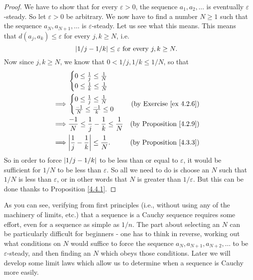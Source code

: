 \begin{proof}
We have to show that for every \(\varepsilon > 0\), the sequence \(a_1, a_2, \dots\) is eventually \(\varepsilon\)-steady.
So let \(\varepsilon > 0\) be arbitrary.
We now have to find a number \(N \geq 1\) such that the sequence \(a_N, a_{N + 1}, \dots\) is \(\varepsilon\)-steady.
Let us see what this means.
This means that \(d(a_j, a_k) \leq \varepsilon\) for every \(j, k \geq N\), i.e.
\[
    \abs*{1 / j - 1 / k} \leq \varepsilon \text{ for every } j, k \geq N.
\]
Now since \(j, k \geq N\), we know that \(0 < 1 / j, 1 / k \leq 1 / N\), so that
\begin{align*}
&
\begin{cases}
    0 \leq \frac{1}{j} \leq \frac{1}{N} \\
    0 \leq \frac{1}{k} \leq \frac{1}{N} \\
\end{cases}
\\
\implies &
\begin{cases}
    0 \leq \frac{1}{j} \leq \frac{1}{N} \\
    \frac{-1}{N} \leq \frac{-1}{k} \leq 0 \\
\end{cases}
& \text{(by Exercise \ref{ex 4.2.6})} \\
\implies & \frac{-1}{N} \leq \frac{1}{j} - \frac{1}{k} \leq \frac{1}{N} & \text{(by Proposition \ref{4.2.9})} \\
\implies & \abs*{\frac{1}{j} - \frac{1}{k}} \leq \frac{1}{N}. & \text{(by Proposition \ref{4.3.3})}
\end{align*}
So in order to force \(\abs*{1 / j - 1 / k}\) to be less than or equal to \(\varepsilon\), it would be sufficient for \(1 / N\) to be less than \(\varepsilon\).
So all we need to do is choose an \(N\) such that \(1 / N\) is less than \(\varepsilon\), or in other words that \(N\) is greater than \(1 / \varepsilon\).
But this can be done thanks to Proposition \ref{4.4.1}.
\end{proof}

\begin{note}
As you can see, verifying from first principles (i.e., without using any of the machinery of limits, etc.) that a sequence is a Cauchy sequence requires some effort, even for a sequence as simple as \(1 / n\).
The part about selecting an \(N\) can be particularly difficult for beginners
- one has to think in reverse, working out what conditions on \(N\) would suffice to force the sequence \(a_N, a_{N + 1}, a_{N + 2}, \dots\) to be \(\varepsilon\)-steady, and then finding an \(N\) which obeys those conditions.
Later we will develop some limit laws which allow us to determine when a sequence is Cauchy more easily.
\end{note}

